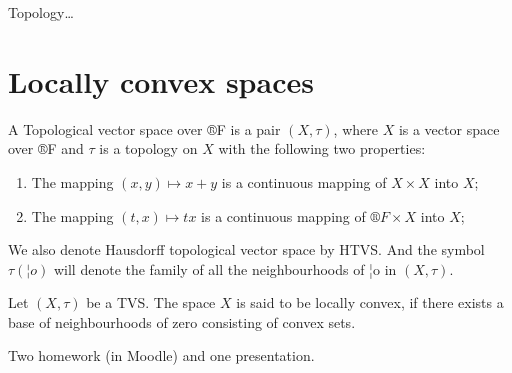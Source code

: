 \documentclass[12pt]{article}					%
\begin{document}

\begin{poznamka}
	Topology…
\end{poznamka}

\vspace{-2em}

\section{Locally convex spaces}

\begin{definice}
	A Topological vector space over ®F is a pair $(X, τ)$, where $X$ is a vector space over ®F and $τ$ is a topology on $X$ with the following two properties:
	\begin{enumerate}
		\item The mapping $(x, y) \mapsto x + y$ is a continuous mapping of $X \times X$ into $X$;
		\item The mapping $(t, x) \mapsto tx$ is a continuous mapping of $®F \times X$ into $X$;
	\end{enumerate}

	We also denote Hausdorff topological vector space by HTVS. And the symbol $τ(¦o)$ will denote the family of all the neighbourhoods of ¦o in $(X, τ)$.
\end{definice}

\begin{definice}
	Let $(X, τ)$ be a TVS. The space $X$ is said to be locally convex, if there exists a base of neighbourhoods of zero consisting of convex sets.
\end{definice}

\begin{poznamka}
	Two homework (in Moodle) and one presentation.
\end{poznamka}
\end{document}
